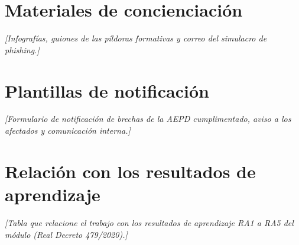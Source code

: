 \documentclass[11pt,a4paper,oneside]{report}
\newcommand{\guia}[1]{{\color{guia}\itshape[#1]}}
\begin{document}
\chapter{Materiales de concienciación}
\guia{Infografías, guiones de las píldoras formativas y correo del simulacro de phishing.}

\chapter{Plantillas de notificación}
\guia{Formulario de notificación de brechas de la AEPD cumplimentado, aviso a los afectados y comunicación interna.}

\chapter{Relación con los resultados de aprendizaje}
\guia{Tabla que relacione el trabajo con los resultados de aprendizaje RA1 a RA5 del módulo (Real Decreto 479/2020).}
\end{document}
